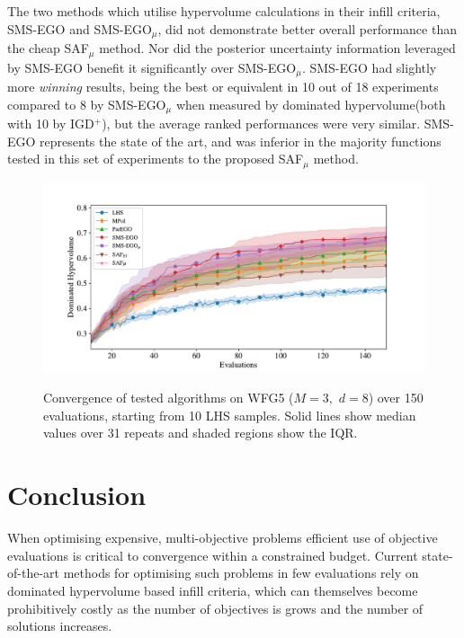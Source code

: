 \documentclass[conference]{IEEEtran}
\newcommand{\ndim}{d}
\newcommand{\nobj}{M}
\newcommand\hpv{dominated hypervolume\xspace}
\newcommand\safmu{SAF$_{\mu}$\xspace}
\newcommand\smsego{SMS-EGO\xspace}
\newcommand\smsegomu{SMS-EGO$_{\mu}$\xspace}
\newcommand\igd{IGD$^+$\xspace}
\begin{document}
The two methods which utilise hypervolume calculations in their infill criteria, \smsego and \smsegomu, did not demonstrate better overall performance than the cheap \safmu method. Nor did the posterior uncertainty information leveraged by \smsego benefit it significantly over \smsegomu. \smsego had slightly more \textit{winning} results, being the best or equivalent in 10 out of 18 experiments compared to 8 by \smsegomu when measured by \hpv (both with 10 by \igd), but the average ranked performances were very similar. \smsego represents the state of the art, and was inferior in the majority functions tested in this set of experiments to the proposed \safmu method. 

\begin{figure}[t]
         \centering
         \includegraphics[width=\columnwidth, 
         trim= 16mm 0mm 22mm 15mm, clip]{figures/wfg5_3obj_8dim_hv_plot.pdf}
         \label{fig: exemplar_pf_sms_saf_hv}
\caption{Convergence of tested algorithms on WFG5 ($\nobj = 3,$ $\ndim = 8$) over 150 evaluations, starting from 10 LHS samples. Solid lines show median values over 31 repeats and shaded regions show the IQR.}
\label{fig: exemplar_hv}
\end{figure}


\section{Conclusion}\label{sec:conclusion}
When optimising expensive, multi-objective problems efficient use of objective evaluations is critical to convergence within a constrained budget. Current state-of-the-art methods for optimising such problems in few evaluations rely on \hpv based infill criteria, which can themselves become prohibitively costly as the number of objectives is grows and the number of solutions increases. 
\end{document}
